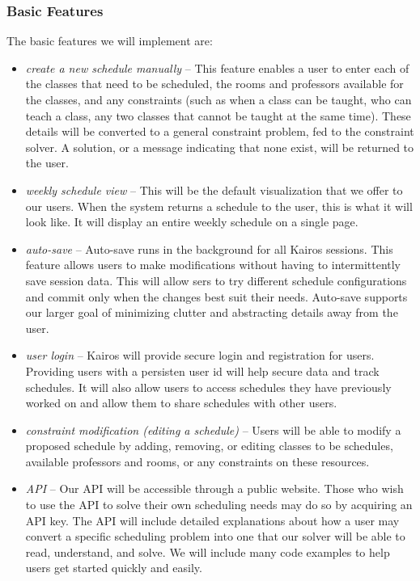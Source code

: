 \documentclass{extarticle}
\begin{document}
\subsubsection{Basic Features}
The basic features we will implement are:
\begin{itemize}
\item \emph{create a new schedule manually} -- This feature enables a user to enter each of the classes that need
to be scheduled, the rooms and professors available for the classes, and any constraints (such as when a class can
be taught, who can teach a class, any two classes that cannot be taught at the same time).  These details will
be converted to a general constraint problem, fed to the constraint solver.  A solution, or a message indicating
that none exist, will be returned to the user.
\item \emph{weekly schedule view} -- This will be the default visualization that we offer to our users. When the
system returns a schedule to the user, this is what it will look like. It will display an entire weekly schedule
on a single page.
\item \emph{auto-save} -- Auto-save runs in the background for all Kairos sessions.  This feature allows users to
make modifications without having to intermittently save session data. This will allow sers to try different
schedule configurations and commit only when the changes best suit their needs.  Auto-save supports our larger goal
of minimizing clutter and abstracting details away from the user.
\item \emph{user login} -- Kairos will provide secure login and registration for users.  Providing users with a
persisten user id will help secure data and track schedules. It will also allow users to access schedules they have
previously worked on and allow them to share schedules with other users.
\item \emph{constraint modification (editing a schedule)} -- Users will be able to modify a proposed schedule by
adding, removing, or editing classes to be schedules, available professors and rooms, or any constraints on these
resources.
\item \emph{API} -- Our API will be accessible through a public website.  Those who wish to use the
API to solve their own scheduling needs may do so by acquiring an API key.  The API will include detailed
explanations about how a user may convert a specific scheduling problem into one that our solver will be able to
read, understand, and solve.  We will include many code examples to help users get started quickly and easily.
\end{itemize}
\end{document}
